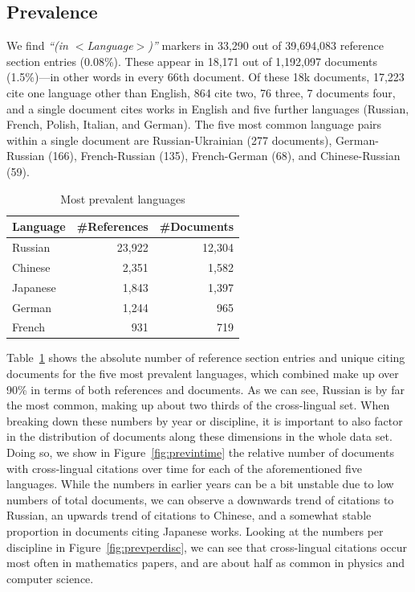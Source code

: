 \subsection{Prevalence}
\label{sec:xling-pevalence}

We find \textit{``(in $<$Language$>$)''} markers in 33,290 out of 39,694,083 reference section entries (0.08\%). These appear in 18,171 out of 1,192,097 documents (1.5\%)---in other words in every 66th document. Of these 18k documents, 17,223 cite one language other than English, 864 cite two, 76 three, 7 documents four, and a single document cites works in English and five further languages (Russian, French, Polish, Italian, and German). The five most common language pairs within a single document are Russian-Ukrainian (277 documents), German-Russian (166), French-Russian (135), French-German (68), and Chinese-Russian (59).

\begin{table}
\caption{Most prevalent languages}
 \label{tab:prevlangs}
  \centering
  \begin{small}
 \begin{threeparttable}
 \begin{tabular}{lrr}
 \toprule
   Language & \#References & \#Documents \\
   \midrule
   Russian & 23,922 & 12,304 \\
   Chinese & 2,351 & 1,582 \\
   Japanese & 1,843 & 1,397 \\
   German & 1,244 & 965 \\
   French & 931 & 719 \\
   \bottomrule
 \end{tabular}
\end{threeparttable}
  \end{small}
\end{table}

Table~\ref{tab:prevlangs} shows the absolute number of reference section entries and unique citing documents for the five most prevalent languages, which combined make up over 90\% in terms of both references and documents. As we can see, Russian is by far the most common, making up about two thirds of the cross-lingual set. When breaking down these numbers by year or discipline, it is important to also factor in the distribution of documents along these dimensions in the whole data set. Doing so, we show in Figure~\ref{fig:previntime} the relative number of documents with cross-lingual citations over time for each of the aforementioned five languages. While the numbers in earlier years can be a bit unstable due to low numbers of total documents, we can observe a downwards trend of citations to Russian, an upwards trend of citations to Chinese, and a somewhat stable proportion in documents citing Japanese works. Looking at the numbers per discipline in Figure~\ref{fig:prevperdisc}, we can see that cross-lingual citations occur most often in mathematics papers, and are about half as common in physics and computer science.

